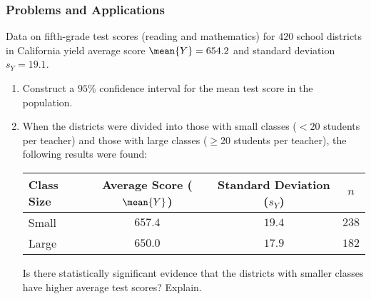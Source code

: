 

\begin{frame}
\frametitle{Problems and Applications}
Data on fifth-grade test scores (reading and mathematics) for $420$ school districts in California yield average score $\mean{Y}=654.2$ and standard deviation $s_{Y}=19.1$.
\begin{enumerate}
\item Construct a $95\%$ confidence interval for the mean test score in the population.
\item When the districts were divided into those with small classes ($< 20$ students per teacher) and those with large classes ($\geq 20$ students per teacher), the following results were found:
\begin{center}
\begin{tabular}{lccc}
\toprule
Class Size & Average Score ($\mean{Y}$)      
                     & Standard Deviation ($s_{Y}$)
                               &   $n$\\
\midrule
Small      & $657.4$ &  $19.4$ & $238$\\
Large      & $650.0$ &  $17.9$ & $182$\\
\bottomrule
\end{tabular}
\end{center}
Is there statistically significant evidence that the districts with smaller classes have higher average test scores? Explain.
\end{enumerate}
\end{frame}
